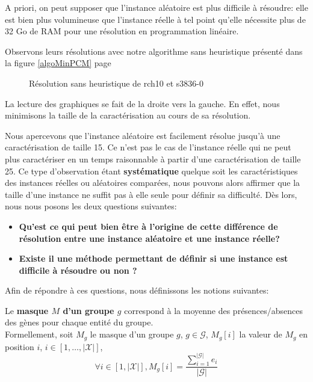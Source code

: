 A priori, on peut supposer que l'instance aléatoire est plus difficile à résoudre: elle est bien plus volumineuse que l'instance réelle à tel point qu'elle nécessite plus de 32 Go de RAM pour une résolution en programmation linéaire.

Observons leurs résolutions avec notre algorithme sans heuristique présenté dans la figure \ref{algoMinPCM} page \pageref{algoMinPCM}
\begin{figure}[H]
\centering
	\begin{minipage}[c]{0.49\linewidth}
	\centering
	
	\end{minipage}
	\begin{minipage}[c]{0.49\linewidth}
	\centering
	
	\end{minipage}
\caption{Résolution sans heuristique de rch10 et s3836-0}
\end{figure} 

\begin{remarque}
La lecture des graphiques se fait de la droite vers la gauche. En effet, nous minimisons la taille de la caractérisation au cours de sa résolution.
\end{remarque}
Nous apercevons que l'instance aléatoire est facilement résolue jusqu'à une caractérisation de taille 15. Ce n'est pas le cas de l'instance réelle qui ne peut plus caractériser en un temps raisonnable à partir d'une caractérisation de taille 25. Ce type d'observation étant \textbf{systématique} quelque soit les caractéristiques des instances réelles ou aléatoires comparées, nous pouvons alors affirmer que la taille d'une instance ne suffit pas à elle seule pour définir sa difficulté. Dès lors, nous nous posons les deux questions suivantes:\\

\begin{itemize}
\item \textbf{Qu'est ce qui peut bien être à l'origine de cette différence de résolution entre une instance aléatoire et une instance réelle?}
\item \textbf{Existe il une méthode permettant de définir si une instance est difficile à résoudre ou non ?}\\
\end{itemize}
Afin de répondre à ces questions, nous définissons les notions suivantes:

\begin{definition}
Le \textbf{masque $M$ d'un groupe $g$} correspond à la moyenne des présences/absences des gènes pour chaque entité du groupe.\\
Formellement, soit $M_g$ le masque d'un groupe $g$, $g \in \mathcal{G}$, $M_g[i]$ la valeur de $M_g$ en position $i$, $i \in [1,\ldots,|\mathcal{X}|]$,
$$\forall i \in  [1, |\mathcal{X}|], M_g[i]= \frac{\sum_{i=1}^{|\mathcal{G}|}e_i}{|\mathcal{G}|} $$
\end{definition}

